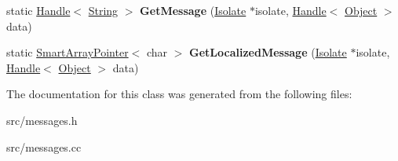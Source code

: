\begin{DoxyCompactItemize}
\item 
\hypertarget{classv8_1_1internal_1_1_message_handler_a05c7290090b9628721213d335da8813c}{}static \hyperlink{classv8_1_1internal_1_1_handle}{Handle}$<$ \hyperlink{classv8_1_1internal_1_1_string}{String} $>$ {\bfseries Get\+Message} (\hyperlink{classv8_1_1internal_1_1_isolate}{Isolate} $\ast$isolate, \hyperlink{classv8_1_1internal_1_1_handle}{Handle}$<$ \hyperlink{classv8_1_1internal_1_1_object}{Object} $>$ data)\label{classv8_1_1internal_1_1_message_handler_a05c7290090b9628721213d335da8813c}

\item 
\hypertarget{classv8_1_1internal_1_1_message_handler_a95681266d83a1150c5665ecea569f736}{}static \hyperlink{classv8_1_1internal_1_1_smart_array_pointer}{Smart\+Array\+Pointer}$<$ char $>$ {\bfseries Get\+Localized\+Message} (\hyperlink{classv8_1_1internal_1_1_isolate}{Isolate} $\ast$isolate, \hyperlink{classv8_1_1internal_1_1_handle}{Handle}$<$ \hyperlink{classv8_1_1internal_1_1_object}{Object} $>$ data)\label{classv8_1_1internal_1_1_message_handler_a95681266d83a1150c5665ecea569f736}

\end{DoxyCompactItemize}


The documentation for this class was generated from the following files\+:\begin{DoxyCompactItemize}
\item 
src/messages.\+h\item 
src/messages.\+cc\end{DoxyCompactItemize}

